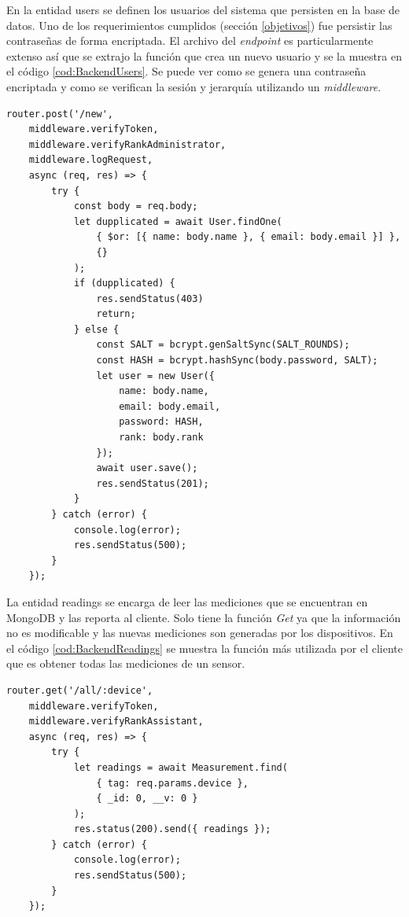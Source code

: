 En la entidad users se definen los usuarios del sistema que persisten en la base de datos.
Uno de los requerimientos cumplidos (sección \ref{objetivos}) fue persistir las contraseñas de forma encriptada.
El archivo del \emph{endpoint} es particularmente extenso así que se extrajo la función que crea un nuevo usuario y se la muestra en el código \ref{cod:BackendUsers}.
Se puede ver como se genera una contraseña encriptada y como se verifican la sesión y jerarquía utilizando un \emph{middleware}.

\begin{lstlisting}[label=cod:BackendUsers,caption=Creación de usuario de la entidad users]
router.post('/new',
    middleware.verifyToken,
    middleware.verifyRankAdministrator,
    middleware.logRequest,
    async (req, res) => {
        try {
            const body = req.body;
            let dupplicated = await User.findOne(
                { $or: [{ name: body.name }, { email: body.email }] },
                {}
            );
            if (dupplicated) {
                res.sendStatus(403)
                return;
            } else {
                const SALT = bcrypt.genSaltSync(SALT_ROUNDS);
                const HASH = bcrypt.hashSync(body.password, SALT);
                let user = new User({
                    name: body.name,
                    email: body.email,
                    password: HASH,
                    rank: body.rank
                });
                await user.save();
                res.sendStatus(201);
            }
        } catch (error) {
            console.log(error);
            res.sendStatus(500);
        }
    });
\end{lstlisting}

La entidad readings se encarga de leer las mediciones que se encuentran en MongoDB y las reporta al cliente.
Solo tiene la función \emph{Get} ya que la información no es modificable y las nuevas mediciones son generadas por los dispositivos.
En el código \ref{cod:BackendReadings} se muestra la función más utilizada por el cliente que es obtener todas las mediciones de un sensor.

\begin{lstlisting}[label=cod:BackendReadings,caption=Función más utilizada de la entidad readings]
router.get('/all/:device',
    middleware.verifyToken,
    middleware.verifyRankAssistant,
    async (req, res) => {
        try {
            let readings = await Measurement.find(
                { tag: req.params.device },
                { _id: 0, __v: 0 }
            );
            res.status(200).send({ readings });
        } catch (error) {
            console.log(error);
            res.sendStatus(500);
        }
    });
\end{lstlisting}

